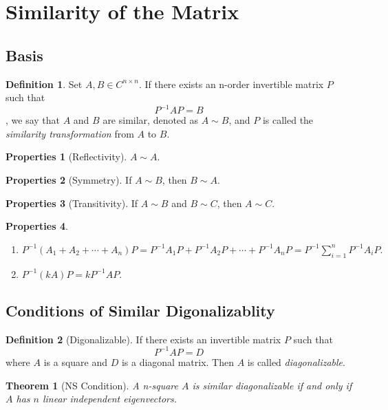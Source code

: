 \documentclass{article}
\newtheorem{theorem}{Theorem}[section]
\theoremstyle{definition}
\newtheorem{defi}{Definition}[section]
\newtheorem{pro}{Properties}[section]
\begin{document}
\section{Similarity of the Matrix}
\subsection{Basis}
\begin{defi}
    Set $A,B\in C^{n\times n}$. If there exists
    an n-order invertible matrix $P$ such that 
    $$P^{-1}AP=B$$, we say that $A$ and $B$ are similar,
    denoted as $A\sim B$, and $P$ is called the 
    \textit{similarity transformation} from $A$ to $B$. 
\end{defi}

\begin{pro}[Reflectivity]
    $A\sim A$.
\end{pro}

\begin{pro}[Symmetry]
    If $A\sim B$, then $B\sim A$.
\end{pro}

\begin{pro}[Transitivity]
    If $A\sim B$ and $B\sim C$, then $A\sim C$.
\end{pro}


\begin{pro}
\begin{enumerate}
\item $P^{-1}(A_{1}+A_{2}+\cdots+A_{n})P=P^{-1}A_{1}P+P^{-1}A_{2}P+\cdots+P^{-1}A_{n}P=P^{-1}\sum_{i=1}^{n}P^{-1}A_{i}P.$
\item $P^{-1}(kA)P=kP^{-1}AP.$
\end{enumerate}
\end{pro}










\subsection{Conditions of Similar Digonalizablity}


\begin{defi}[Digonalizable]
    If there exists an invertible matrix $P$ such that
    $$P^{-1}AP=D$$
    where $A$ is a square and $D$ is a diagonal matrix.
    Then $A$ is called \textit{diagonalizable}.
\end{defi}

\begin{theorem}[NS Condition]
    A n-square $A$ is similar diagonalizable if and only if $A$ has $n$ linear independent eigenvectors.
\label{theorem:NS}
\end{theorem}
\end{document}
